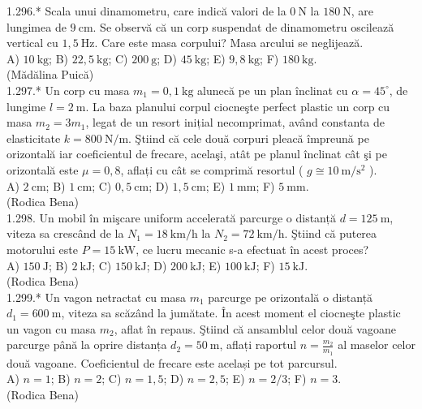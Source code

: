 1.296.* Scala unui dinamometru, care indică valori de la $0 \mathrm{~N}$ la $180 \mathrm{~N}$, are lungimea de $9 \mathrm{~cm}$. Se observă că un corp suspendat de dinamometru oscilează vertical cu $1,5 \mathrm{~Hz}$. Care este masa corpului? Masa arcului se neglijează.\\ A) $10 \mathrm{~kg}$; B) $22,5 \mathrm{~kg}$; C) $200 \mathrm{~g}$; D) $45 \mathrm{~kg}$; E) $9,8 \mathrm{~kg}$; F) $180 \mathrm{~kg}$.\\ (Mădălina Puică)\\

1.297.* Un corp cu masa $m_{1}=0,1 \mathrm{~kg}$ alunecă pe un plan înclinat cu $\alpha=45^{\circ}$, de lungime $l=2 \mathrm{~m}$. La baza planului corpul ciocneşte perfect plastic un corp cu masa $m_{2}=3 m_{1}$, legat de un resort inițial necomprimat, având constanta de elasticitate $k=800 \mathrm{~N} / \mathrm{m}$. Ştiind că cele două corpuri pleacă împreună pe orizontală iar coeficientul de frecare, acelaşi, atât pe planul înclinat cât şi pe orizontală este $\mu=0,8$, aflați cu cât se comprimă resortul ( $g \cong 10 \mathrm{~m} / \mathrm{s}^{2}$ ).\\ A) $2 \mathrm{~cm}$; B) $1 \mathrm{~cm}$; C) $0,5 \mathrm{~cm}$; D) $1,5 \mathrm{~cm}$; E) $1 \mathrm{~mm}$; F) $5 \mathrm{~mm}$.\\ (Rodica Bena)\\

1.298. Un mobil în mişcare uniform accelerată parcurge o distanță $d=125 \mathrm{~m}$, viteza sa crescând de la $N_{1}=18 \mathrm{~km} / \mathrm{h}$ la $N_{2}=72 \mathrm{~km} / \mathrm{h}$. Ştiind că puterea motorului este $P=15 \mathrm{~kW}$, ce lucru mecanic s-a efectuat în acest proces?\\ A) $150 \mathrm{~J}$; B) $2 \mathrm{~kJ}$; C) $150 \mathrm{~kJ}$; D) $200 \mathrm{~kJ}$; E) $100 \mathrm{~kJ}$; F) $15 \mathrm{~kJ}$.\\ (Rodica Bena)\\

1.299.* Un vagon netractat cu masa $m_{1}$ parcurge pe orizontală o distanță $d_{1}=600 \mathrm{~m}$, viteza sa scăzând la jumătate. În acest moment el ciocneşte plastic un vagon cu masa $m_{2}$, aflat în repaus. Ştiind că ansamblul celor două vagoane parcurge până la oprire distanța $d_{2}=50 \mathrm{~m}$, aflați raportul $n=\frac{m_{2}}{m_{1}}$ al maselor celor două vagoane. Coeficientul de frecare este același pe tot parcursul.\\ A) $n=1$; B) $n=2$; C) $n=1,5$; D) $n=2,5$; E) $n=2 / 3$; F) $n=3$.\\ (Rodica Bena)\\

